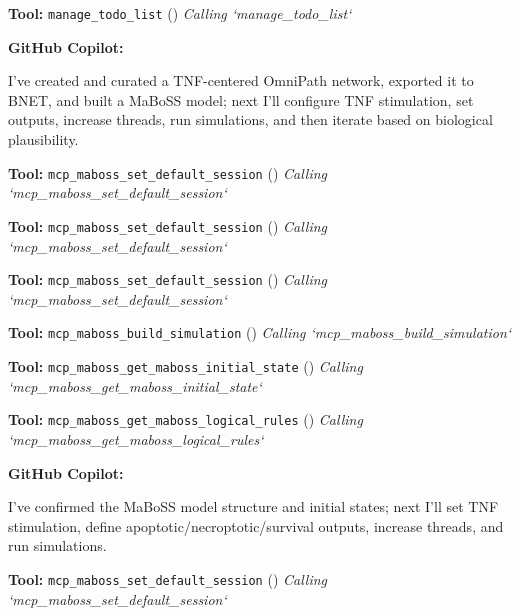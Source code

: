 \documentclass[11pt,a4paper]{article}
\begin{document}
\begin{toolokbox}
\textbf{Tool:} \texttt{manage\_todo\_list} (\checkmark)
\textit{Calling `manage\_todo\_list`}
\end{toolokbox}
\begin{copilotbox}
\textbf{GitHub Copilot:}

I’ve created and curated a TNF-centered OmniPath network, exported it to BNET, and built a MaBoSS model; next I’ll configure TNF stimulation, set outputs, increase threads, run simulations, and then iterate based on biological plausibility.

\end{copilotbox}
\begin{toolokbox}
\textbf{Tool:} \texttt{mcp\_maboss\_set\_default\_session} (\checkmark)
\textit{Calling `mcp\_maboss\_set\_default\_session`}
\end{toolokbox}
\begin{toolokbox}
\textbf{Tool:} \texttt{mcp\_maboss\_set\_default\_session} (\checkmark)
\textit{Calling `mcp\_maboss\_set\_default\_session`}
\end{toolokbox}
\begin{toolokbox}
\textbf{Tool:} \texttt{mcp\_maboss\_set\_default\_session} (\checkmark)
\textit{Calling `mcp\_maboss\_set\_default\_session`}
\end{toolokbox}
\begin{toolokbox}
\textbf{Tool:} \texttt{mcp\_maboss\_build\_simulation} (\checkmark)
\textit{Calling `mcp\_maboss\_build\_simulation`}
\end{toolokbox}
\begin{toolokbox}
\textbf{Tool:} \texttt{mcp\_maboss\_get\_maboss\_initial\_state} (\checkmark)
\textit{Calling `mcp\_maboss\_get\_maboss\_initial\_state`}
\end{toolokbox}
\begin{toolokbox}
\textbf{Tool:} \texttt{mcp\_maboss\_get\_maboss\_logical\_rules} (\checkmark)
\textit{Calling `mcp\_maboss\_get\_maboss\_logical\_rules`}
\end{toolokbox}
\begin{copilotbox}
\textbf{GitHub Copilot:}

I’ve confirmed the MaBoSS model structure and initial states; next I’ll set TNF stimulation, define apoptotic/necroptotic/survival outputs, increase threads, and run simulations.

\end{copilotbox}
\begin{toolokbox}
\textbf{Tool:} \texttt{mcp\_maboss\_set\_default\_session} (\checkmark)
\textit{Calling `mcp\_maboss\_set\_default\_session`}
\end{toolokbox}
\end{document}
